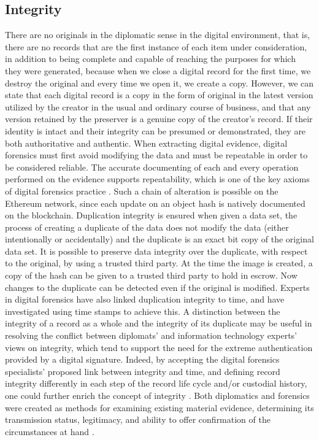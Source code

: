 \subsection{Integrity}
There are no originals in the diplomatic sense in the digital environment, that is, there are no records that are the first instance of each item under consideration, in addition to being complete and capable of reaching the purposes for which they were generated, because when we close a digital record for the first time, we destroy the original and every time we open it, we create a copy. However, we can state that each digital record is a copy in the form of original in the latest version utilized by the creator in the usual and ordinary course of business, and that any version retained by the preserver is a genuine copy of the creator's record.
If their identity is intact and their integrity can be presumed or demonstrated, they are both authoritative and authentic. When extracting digital evidence, digital forensics must first avoid modifying the data and must be repeatable in order to be considered reliable. The accurate documenting of each and every operation performed on the evidence supports repeatability, which is one of the key axioms of digital forensics practice \cite[58]{duranti2009digital}. 
Such a chain of alteration is possible on the Ethereum network, since each update on an object hash is natively documented on the blockchain.
Duplication integrity is ensured when given a data set, the process of creating a duplicate of the data does not modify the data (either intentionally or accidentally) and the duplicate is an exact bit copy of the original data set. It is possible to preserve data integrity over the duplicate, with respect to the original, by using a trusted third party. At the time the image is created, a copy of the hash can be given to a trusted third party to hold in escrow. Now changes to the duplicate can be detected even if the original is modified.
Experts in digital forensics have also linked duplication integrity to time, and have investigated using time stamps to achieve this. A distinction between the integrity of a record as a whole and the integrity of its duplicate may be useful in resolving the conflict between diplomats' and information technology experts' views on integrity, which tend to support the need for the extreme authentication provided by a digital signature. Indeed, by accepting the digital forensics specialists' proposed link between integrity and time, and defining record integrity differently in each step of the record life cycle and/or custodial history, one could further enrich the concept of integrity \cite[60]{duranti2009digital}.
Both diplomatics and forensics were created as methods for examining existing material evidence, determining its transmission status, legitimacy, and ability to offer confirmation of the circumstances at hand \cite[64]{duranti2009digital}.

